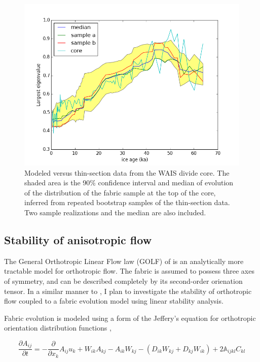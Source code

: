 \documentclass{article}
\begin{document}
\begin{figure}
\caption{Modeled versus thin-section data from the WAIS divide core. The shaded area is the 90\% confidence interval and median of evolution of the distribution of the fabric sample at the top of the core, inferred from repeated bootstrap samples of the thin-section data. Two sample realizations and the median are also included.}
\includegraphics[width=12cm]{good_fit}
\end{figure}


\subsection{Stability of anisotropic flow}

The General Orthotropic Linear Flow law (GOLF) of \citet{gillet2005} is an analytically more tractable model for orthotropic flow. The fabric is assumed to possess three axes of symmetry, and can be described completely by its second-order orienation tensor. In a similar manner to \citet{montgomery-smith2011}, I plan to investigate the stability of orthotropic flow coupled to a fabric evolution model using linear stability analysis.

Fabric evolution is modeled using a form of the Jeffery's equation for orthotropic orientation distribution functions \citep{gillet2006},

\begin{equation}
   \frac{\partial A_{ij}}{\partial t} = -\frac{\partial}{\partial x_k} A_{ij} u_k + W_{ik} A_{kj} - A_{ik} W_{kj} - (D_{ik}W_{kj} + D_{kj}W_{ik}) + 2 \mathbb{A}_{ijkl} C_{kl}
\end{equation}
\end{document}
